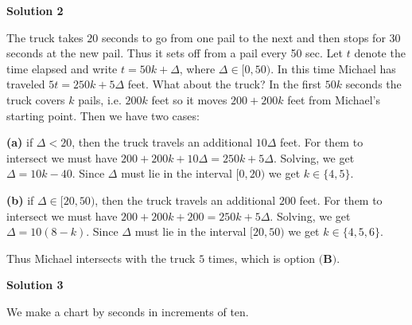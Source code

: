 \begin{enumerate}
\textbf{Solution 2}

The truck takes $20$ seconds to go from one pail to the next and then stops for $30$ seconds at the new pail. Thus it sets off from a pail every 50 sec. Let $t$ denote the time elapsed and write $t=50k + \Delta$, where $\Delta \in [0,50)$. In  this time Michael has traveled $5t = 250k+5\Delta$ feet. What about the truck? In the first $50k$ seconds the truck covers $k$ pails, i.e. $200k$ feet so it moves $200+200k$ feet from Michael's starting point. Then we have two cases: 

 \textbf{(a)} if $\Delta < 20$, then the truck travels an additional $10\Delta$ feet. For them to intersect we must have $200+200k + 10\Delta = 250k + 5\Delta$. Solving, we get $\Delta = 10k - 40$. Since $\Delta$ must lie in the interval $[0,20)$ we get $k \in \{4, 5\}$.

 \textbf{(b)} if $\Delta \in [20, 50)$, then the truck travels an additional $200$ feet. For them to intersect we must have $200+200k + 200 = 250k + 5\Delta$. Solving, we get $\Delta = 10(8-k)$. Since $\Delta$ must lie in the interval $[20,50)$ we get $k \in \{4, 5, 6\}$. 

 Thus Michael intersects with the truck $5$ times, which is option $\boxed{\textbf{(B)}}$.

 



\textbf{Solution 3}

We make a chart by seconds in increments of ten. 


\end{enumerate}
